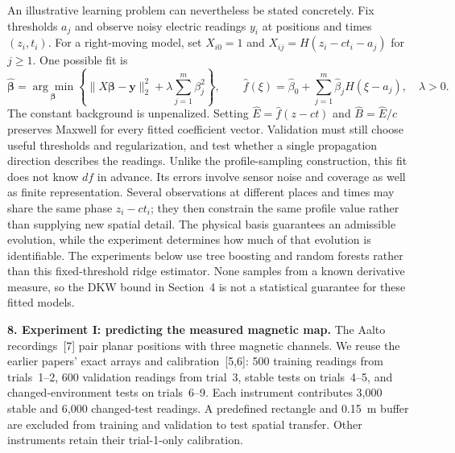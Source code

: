 \documentclass[11pt,letterpaper]{article}
\begin{document}
An illustrative learning problem can nevertheless be stated concretely. Fix thresholds $a_j$
and observe noisy electric readings $y_i$ at positions and times $(z_i,t_i)$.
For a right-moving model, set $X_{i0}=1$ and
$X_{ij}=H(z_i-ct_i-a_j)$ for $j\ge1$. One possible fit is
\begin{equation}
 \widehat{\boldsymbol\beta}
 =\underset{\boldsymbol\beta}{\arg\min}\left\{
 \|X\boldsymbol\beta-\mathbf y\|_2^2
 +\lambda\sum_{j=1}^{m}\beta_j^2\right\},\qquad
 \widehat f(\xi)=\widehat\beta_0+
 \sum_{j=1}^{m}\widehat\beta_jH(\xi-a_j),\quad\lambda>0.
\end{equation}
The constant background is unpenalized. Setting $\widehat E=\widehat f(z-ct)$
and $\widehat B=\widehat E/c$ preserves Maxwell for every fitted coefficient
vector. Validation must still choose useful thresholds and regularization,
and test whether a single propagation direction describes the readings.
Unlike the profile-sampling construction, this fit does not know $df$ in advance.
Its errors involve sensor noise and coverage as well as finite representation.
Several observations at different places and times may share the same phase
$z_i-ct_i$; they then constrain the same profile value rather than supplying
new spatial detail. The physical basis guarantees an admissible evolution,
while the experiment determines how much of that evolution is identifiable.
The experiments below use tree boosting and random forests rather than this
fixed-threshold ridge estimator. None samples from a known derivative measure,
so the DKW bound in Section~4 is not a statistical guarantee for these fitted models.

\textbf{8. Experiment I: predicting the measured magnetic map.}
The Aalto recordings~[7] pair planar positions with three magnetic channels.
We reuse the earlier papers' exact arrays and calibration~[5,6]: 500 training
readings from trials~1--2, 600 validation readings from trial~3, stable tests
on trials~4--5, and changed-environment tests on trials~6--9. Each instrument
contributes 3,000 stable and 6,000 changed-test readings. A predefined rectangle
and 0.15~m buffer are excluded from training and validation to test spatial
transfer. Other instruments retain their trial-1-only calibration.
\end{document}
